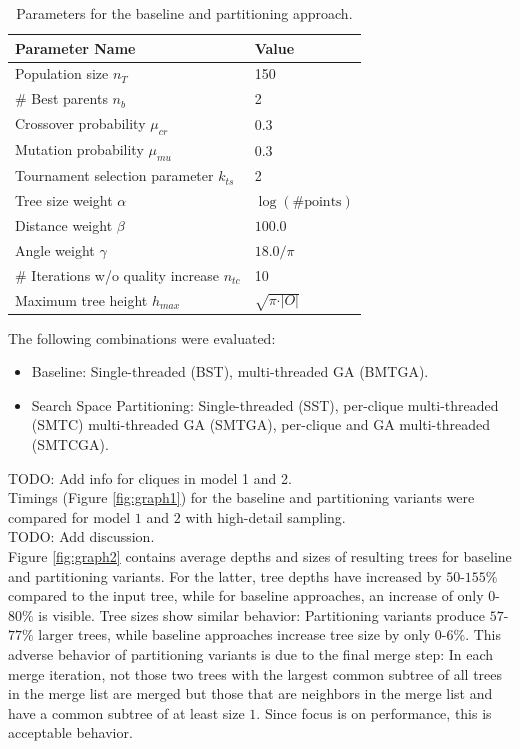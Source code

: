 \begin{table}[h]
	\centering
	\begin{tabular}{|l|l|}
		\hline
		\textbf{Parameter Name} & \textbf{Value}  \\
		\hline
		Population size $n_T$ & 150 \\
		\hline
		\# Best parents $n_b$ & 2 \\
		\hline
		Crossover probability $\mu_{cr}$& 0.3 \\
		\hline
		Mutation probability $\mu_{mu}$& 0.3 \\
		\hline
		Tournament selection parameter $k_{ts}$ & 2\\
		\hline
		Tree size weight $\alpha$& $\log(\text{\#points})$\\
		\hline
		Distance weight $\beta$& $100.0$ \\
		\hline
		Angle weight $\gamma$& $18.0/\pi$ \\
		\hline 
		\# Iterations w/o quality increase $n_{tc}$ & 10 \\
		\hline 
		Maximum tree height $h_{max}$ & $\sqrt{\pi\cdot \vert O \vert}$ \\
		\hline 
	\end{tabular}
	\caption{Parameters for the baseline and partitioning approach.}
	\label{tab:gaparams}
\end{table}
The following combinations were evaluated:
\begin{itemize}
	\item Baseline: Single-threaded (BST), multi-threaded \ac{GA} (BMTGA).
	\item Search Space Partitioning: Single-threaded (SST), per-clique multi-threaded (SMTC) multi-threaded \ac{GA} (SMTGA), per-clique and \ac{GA} multi-threaded (SMTCGA).
\end{itemize}     
TODO: Add info for cliques in model 1 and 2.
\\
Timings (Figure \ref{fig:graph1}) for the baseline and partitioning variants were compared for model $1$ and $2$ with high-detail sampling.
\\
TODO: Add discussion.
\\
Figure \ref{fig:graph2} contains average depths and sizes of resulting trees for baseline and partitioning variants.
For the latter, tree depths have increased by $50$-$155\%$ compared to the input tree, while for baseline approaches, an increase of only $0$-$80\%$ is visible.
Tree sizes show similar behavior:
Partitioning variants produce $57$-$77\%$ larger trees, while baseline approaches increase tree size by only $0$-$6\%$.
This adverse behavior of partitioning variants is due to the final merge step:
In each merge iteration, not those two trees with the largest common subtree of all trees in the merge list are merged but those that are neighbors in the merge list and have a common subtree of at least size $1$.
Since focus is on performance, this is acceptable behavior.
\\
  
